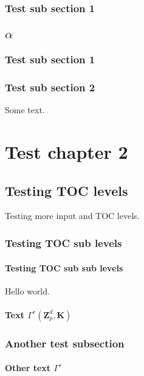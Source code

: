 \documentclass{book}
\begin{document}
\subsection{Test sub section 1}

\section{$\alpha$}

\subsection{Test sub section 1}

\subsection{Test sub section 2}
Some text.

\chapter{Test chapter 2}

\section{Testing TOC levels}
Testing more input and TOC levels.

\subsection{Testing TOC sub levels}

\subsubsection{Testing TOC sub sub levels}
Hello world.

\subsubsection{Text $\Gamma^{r}(\ensuremath{{\mathbf{Z}}}_p^d,\mathbf{K})$}

\subsection{Another test subsection}

\subsubsection{Other text $\Gamma^{r}$}
\end{document}
